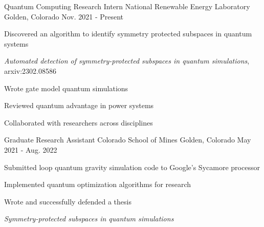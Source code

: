 

\begin{cventries}

  \cventry
    {Quantum Computing Research Intern}
    {National Renewable Energy Laboratory}
    {Golden, Colorado}
    {Nov. 2021 - Present}
    {
      \begin{cvitems}
        \item {Discovered an algorithm to identify symmetry protected subspaces in quantum systems}\\
        \begin{cvitems}
          \item {\textit{Automated detection of symmetry-protected subspaces in quantum simulations}, arxiv:2302.08586}\\
        \end{cvitems}
        \item {Wrote gate model quantum simulations}
        \item {Reviewed quantum advantage in power systems}
        \item {Collaborated with researchers across disciplines}
      \end{cvitems}
    }

  \cventry
    {Graduate Research Assistant}
    {Colorado School of Mines}
    {Golden, Colorado}
    {May 2021 - Aug. 2022}
    {
      \begin{cvitems}
        \item {Submitted loop quantum gravity simulation code to Google's Sycamore processor}
        \item {Implemented quantum optimization algorithms for research}
        \item {Wrote and successfully defended a thesis}\\
        \begin{cvitems}
          \item {\textit{Symmetry-protected subspaces in quantum simulations}}\\
        \end{cvitems}
      \end{cvitems}
    }


\end{cventries}
